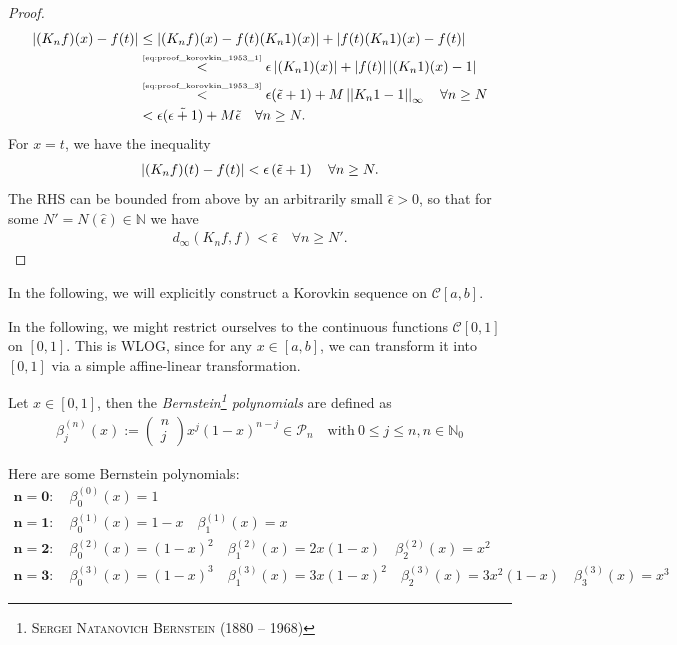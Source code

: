 \begin{proof}
\begin{align}
		\left\vert (K_nf)(x) - f(t) \right\vert &\leq \left\vert (K_n f)(x) - f(t)(K_n 1)(x) \right\vert + \left\vert f(t)(K_n 1)(x) - f(t) \right\vert		
		\\ &\overset{\tiny \eqref{eq:proof_korovkin_1953_1}}{<} \epsilon\left\vert (K_n 1)(x) \right\vert + \left\vert f(t) \right\vert\left\vert (K_n 1)(x) - 1 \right\vert 
		\\ &\overset{\tiny\eqref{eq:proof_korovkin_1953_3}}{<} \epsilon(\tilde{\epsilon} + 1) + M\left\vert\left\vert K_n 1 - 1 \right\vert\right\vert_{\infty}   \quad \forall n\geq N
		\\ &< \epsilon(\tilde{\epsilon + 1}) + M\tilde{\epsilon} \quad \forall n\geq N.
	\end{align}
	For $x = t$, we have the inequality 
	\begin{align}
		\left\vert (K_nf)(t) - f(t) \right\vert < \epsilon \left(\tilde{\epsilon} + 1\right) \quad \forall n\geq N.
	\end{align}
	The RHS can be bounded from above by an arbitrarily small $\hat{\epsilon} > 0$, so that for some $N' = N(\hat{\epsilon})\in\mathbb N$ we have
	\begin{align}
		d_{\infty}(K_nf, f) < \hat{\epsilon} \quad \forall n\geq N'.
	\end{align}	
\end{proof}

In the following, we will explicitly construct a Korovkin sequence on $\mathcal C[a, b]$.

\begin{remark}
	In the following, we might restrict ourselves to the continuous functions $\mathcal C[0, 1]$ on $[0, 1]$. This is WLOG, since for any $x\in [a, b]$, we can transform it into $[0, 1]$ via a simple affine-linear transformation.
\end{remark}

\begin{defn}\label{defn:Bernstein-polynomials}
	Let $x\in[0, 1]$, then the \textit{Bernstein\footnote{\textsc{Sergei Natanovich Bernstein} (1880 -- 1968)} polynomials} are defined as
	\begin{align}
		\beta_{j}^{(n)}(x) := \begin{pmatrix}
			n \\ j
		\end{pmatrix} x^j (1 - x)^{n-j} \in\mathcal P_n \quad \text{with}\ 0\leq j\leq n, n\in \mathbb N_{0}
	\end{align}
\end{defn}

\begin{exmp}
	Here are some Bernstein polynomials:
	\begin{gather*}
		\bm{n = 0}: \quad \beta_{0}^{(0)}(x) = 1
		\\[6pt]
		\bm{n = 1}: \quad \beta_{0}^{(1)}(x) = 1 - x \quad \beta_{1}^{(1)}(x) = x
		\\[6pt]
		\bm{n = 2}: \quad \beta_{0}^{(2)}(x) = (1 - x)^2 \quad \beta_{1}^{(2)}(x) = 2x(1 - x) \quad \beta_{2}^{(2)}(x) = x^2
		\\[6pt]
		\bm{n = 3}: \quad \beta_{0}^{(3)}(x) = (1-x)^3 \quad \beta_{1}^{(3)}(x) = 3x(1-x)^2 \quad \beta_{2}^{(3)}(x) = 3x^2(1-x) \quad \beta_{3}^{(3)}(x) = x^3
	\end{gather*} 
\end{exmp}

